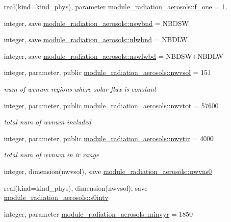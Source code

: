 \begin{DoxyCompactItemize}
real(kind=kind\+\_\+phys), parameter \hyperlink{group__module__radiation__aerosols_ga63babe7f9ec4ff6a0364993f4be3768e}{module\+\_\+radiation\+\_\+aerosols\+::f\+\_\+one} = 1.
\item 
integer, save \hyperlink{group__module__radiation__aerosols_ga1d6c41e3bb818aa8b6f8f10d1c3f38a7}{module\+\_\+radiation\+\_\+aerosols\+::nswbnd} = N\+B\+D\+SW
\item 
integer, save \hyperlink{group__module__radiation__aerosols_gab17b7f75d6d737fd2fc81eae44cba81d}{module\+\_\+radiation\+\_\+aerosols\+::nlwbnd} = N\+B\+D\+LW
\item 
integer, save \hyperlink{group__module__radiation__aerosols_gab77b3b4aa76361277d828c7ba5dc3eda}{module\+\_\+radiation\+\_\+aerosols\+::nswlwbd} = N\+B\+D\+SW+N\+B\+D\+LW
\item 
integer, parameter, public \hyperlink{group__module__radiation__aerosols_ga2e0dc6d161d1906050efd67c471673c9}{module\+\_\+radiation\+\_\+aerosols\+::nwvsol} = 151
\begin{DoxyCompactList}\small\item\em num of wvnum regions where solar flux is constant \end{DoxyCompactList}\item 
integer, parameter, public \hyperlink{group__module__radiation__aerosols_gae94df49c8ff8c0ec8e6b8adb891f3c6b}{module\+\_\+radiation\+\_\+aerosols\+::nwvtot} = 57600
\begin{DoxyCompactList}\small\item\em total num of wvnum included \end{DoxyCompactList}\item 
integer, parameter, public \hyperlink{group__module__radiation__aerosols_ga45b2c26ccba5d4fd2dfccf31bcc02824}{module\+\_\+radiation\+\_\+aerosols\+::nwvtir} = 4000
\begin{DoxyCompactList}\small\item\em total num of wvnum in ir range \end{DoxyCompactList}\item 
integer, dimension(nwvsol), save \hyperlink{group__module__radiation__aerosols_ga80194c8356dfb92a43306abbe7097711}{module\+\_\+radiation\+\_\+aerosols\+::nwvns0}
\item 
real(kind=kind\+\_\+phys), dimension(nwvsol), save \hyperlink{group__module__radiation__aerosols_gaed8bb8a8bc26d72a6c3d31ed4430941f}{module\+\_\+radiation\+\_\+aerosols\+::s0intv}
\item 
integer, parameter \hyperlink{group__module__radiation__aerosols_gab37644d8cc2c222af700b86db91f05e7}{module\+\_\+radiation\+\_\+aerosols\+::minvyr} = 1850

\end{DoxyCompactItemize}
